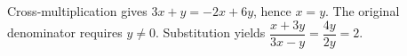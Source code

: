 Cross-multiplication gives $3x+y=-2x+6y$, hence $x=y$. The original denominator requires $y\ne0$. Substitution yields $\dfrac{x+3y}{3x-y}=\dfrac{4y}{2y}=\boxed2$.
